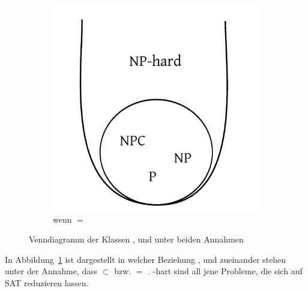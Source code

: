 \begin{figure}
\begin{center}
\begin{subfigure}[b]{0.4\textwidth}
      \includegraphics[width=\textwidth]{img/np_eq_p.pdf}
      \caption{wenn \cP{} $=$ \cNP{}}
    \end{subfigure}
  \end{center}
  \caption{Venndiagramm der Klassen \cNP{}, \cP{} und \cNPC{} unter beiden Annahmen}
  \label{fig:p_np_npc}
\end{figure}

In Abbildung~\ref{fig:p_np_npc} ist dargestellt in welcher Beziehung \cP{}, \cNP{} und \cNPC{} zueinander stehen unter der Annahme, dass \cP{} $\subset$ \cNP{} bzw. \cP{} $=$ \cNP{}. \cNP{}-hart sind all jene Probleme, die sich auf SAT reduzieren lassen.

